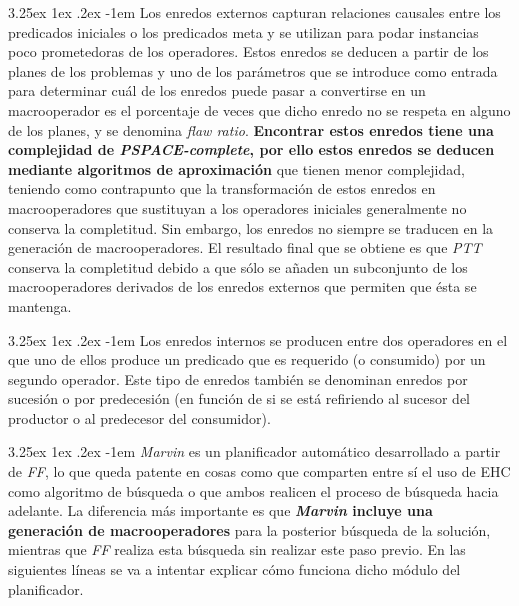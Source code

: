 \documentclass{article}
\makeatletter
\newcounter{subsubsubsection}
\renewcommand\paragraph{\@startsection{paragraph}{5}{\z@}%
      {3.25ex \@plus1ex \@minus.2ex}%
      {-1em}%
      {\normalfont\normalsize\bfseries}}
\makeatother
\begin{document}
    \paragraph{}
    Los enredos externos capturan relaciones causales entre los predicados iniciales o los predicados meta y se utilizan para podar instancias poco prometedoras de los operadores. Estos enredos se deducen a partir de los planes de los problemas y uno de los parámetros que se introduce como entrada para determinar cuál de los enredos puede pasar a convertirse en un macrooperador es el porcentaje de veces que dicho enredo no se respeta en alguno de los planes, y se denomina \textit{flaw ratio}. \textbf{Encontrar estos enredos tiene una complejidad de \textit{PSPACE-complete}, por ello estos enredos se deducen mediante algoritmos de aproximación} que tienen menor complejidad, teniendo como contrapunto que la transformación de estos enredos en macrooperadores que sustituyan a los operadores iniciales generalmente no conserva la completitud. Sin embargo, los enredos no siempre se traducen en la generación de macrooperadores. El resultado final que se obtiene es que \textit{PTT} conserva la completitud debido a que sólo se añaden un subconjunto de los macrooperadores derivados de los enredos externos que permiten que ésta se mantenga.
    
    \paragraph{}
    Los enredos internos se producen entre dos operadores en el que uno de ellos produce un predicado que es requerido (o consumido) por un segundo operador. Este tipo de enredos también se denominan enredos por sucesión o por predecesión (en función de si se está refiriendo al sucesor del productor o al predecesor del consumidor).
    
    
    \paragraph{}
    \textit{Marvin} es un planificador automático desarrollado a partir de \textit{FF}, lo que queda patente en cosas como que comparten entre sí el uso de EHC como algoritmo de búsqueda o que ambos realicen el proceso de búsqueda hacia adelante. La diferencia más importante es que \textbf{\textit{Marvin} incluye una generación de macrooperadores} para la posterior búsqueda de la solución, mientras que \textit{FF} realiza esta búsqueda sin realizar este paso previo. En las siguientes líneas se va a intentar explicar cómo funciona dicho módulo del planificador.
    
\end{document}
